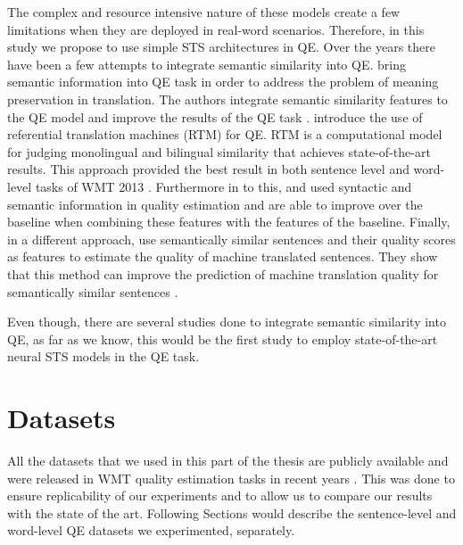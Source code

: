 The complex and resource intensive nature of these models create a few limitations when they are deployed in real-word scenarios. Therefore, in this study we propose to use simple STS architectures in QE. Over the years there have been a few attempts to integrate semantic similarity into QE. \autocite{specia2011predicting} bring semantic information into QE task in order to address the problem of meaning preservation in translation. The authors integrate semantic similarity features to the QE model and improve the results of the QE task \autocite{specia2011predicting}. \autocite{bicici-way-2014-referential} introduce the use of referential translation machines (RTM) for QE. RTM is a computational model for judging monolingual and bilingual similarity that achieves state-of-the-art results. This approach provided the best result in both sentence level and word-level tasks of WMT 2013 \autocite{bojar-etal-2013-findings}. Furthermore in to this, \autocite{kaljahi-etal-2014-syntax} and \autocite{camargo-de-souza-etal-2014-fbk} used syntactic and semantic information in quality estimation and are able to improve over the baseline when combining these features with the features of the baseline. Finally, in a different approach, \autocite{bechara-etal-2016-semantic} use semantically similar sentences and their quality scores as features to estimate the quality of machine translated sentences. They show that this method can improve the prediction of machine translation quality for semantically similar sentences \autocite{bechara-etal-2016-semantic}. 

Even though, there are several studies done to integrate semantic similarity into QE, as far as we know, this would be the first study to employ state-of-the-art neural STS models in the QE task. 

\section{Datasets}
\label{sec:qe_datasets}

 All the datasets that we used in this part of the thesis are publicly available and were released in WMT quality estimation tasks in recent years \autocite{specia-etal-2018-findings,fonseca-etal-2019-findings,specia-etal-2020-findings-wmt}. This was done to ensure replicability of our experiments and to allow us to compare our results with the state of the art. Following Sections would describe the sentence-level and word-level QE datasets we experimented, separately.


